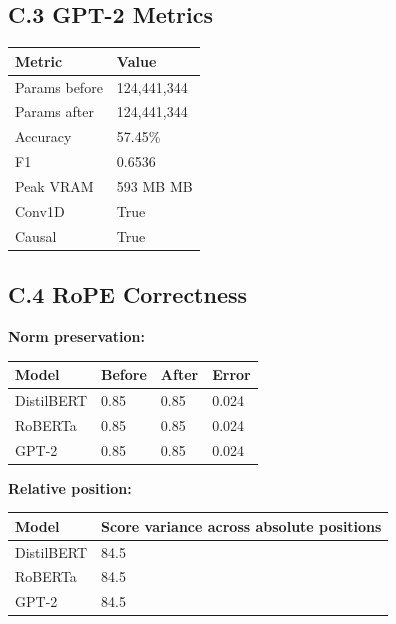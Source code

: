 {\subsection{C.3 GPT-2 Metrics}

\begin{table}[H]
\centering
\small
\begin{tabular}{ll}
\toprule
\textbf{Metric} & \textbf{Value} \\
\midrule
Params before & 124,441,344 \\
Params after & 124,441,344 \\
Accuracy & 57.45\% \\
F1 & 0.6536 \\
Peak VRAM & 593 MB MB \\
Conv1D & True \\
Causal & True \\
\bottomrule
\end{tabular}
\end{table}

\subsection{C.4 RoPE Correctness}

\textbf{Norm preservation:}

\begin{table}[H]
\centering
\small
\begin{tabular}{llll}
\toprule
\textbf{Model} & \textbf{Before} & \textbf{After} & \textbf{Error} \\
\midrule
DistilBERT & 0.85 & 0.85 & 0.024 \\
RoBERTa & 0.85 & 0.85 & 0.024 \\
GPT-2 & 0.85 & 0.85 & 0.024 \\
\bottomrule
\end{tabular}
\end{table}

\textbf{Relative position:}

\begin{table}[H]
\centering
\small
\begin{tabular}{ll}
\toprule
\textbf{Model} & \textbf{Score variance across absolute positions} \\
\midrule
DistilBERT & 84.5 \\
RoBERTa & 84.5 \\
GPT-2 & 84.5 \\
\bottomrule
\end{tabular}
\end{table}

}
